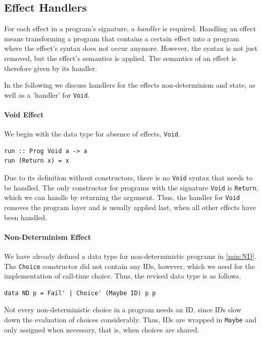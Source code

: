 \documentclass[a4paper, 11pt, fleqn, twoside, abstract=on]{scrreprt}
\newcommand{\hinl}[1]{\texttt{#1}}
\begin{document}
\subsection{Effect Handlers}
\label{subsec:effectHandlers}
For each effect in a program's signature, a \textit{handler} is required.
Handling an effect means transforming a program that contains a certain effect into a program where the effect's syntax does not occur anymore.
However, the syntax is not just removed, but the effect's semantics is applied.
The semantics of an effect is therefore given by its handler.

In the following we discuss handlers for the effects non-determinism and state, as well as a 'handler' for \hinl{Void}.

\paragraph{Void Effect}
We begin with the data type for absence of effects, \hinl{Void}.

\begin{verbatim}
run :: Prog Void a -> a
run (Return x) = x
\end{verbatim}
\noindent
Due to its definition without constructors, there is no \hinl{Void} syntax that needs to be handled.
The only constructor for programs with the signature \hinl{Void} is \hinl{Return}, which we can handle by returning the argument.
Thus, the handler for \hinl{Void} removes the program layer and is usually applied last, when all other effects have been handled.

\paragraph{Non-Determinism Effect}
We have already defined a data type for non-deterministic programs in \autoref{min:ND}.
The \hinl{Choice} constructor did not contain any IDs, however, which we need for the implementation of call-time choice.
Thus, the revised data type is as follows.

\begin{verbatim}
data ND p = Fail' | Choice' (Maybe ID) p p
\end{verbatim}

Not every non-deterministic choice in a program needs an ID, since IDs slow down the evaluation of choices considerably.
Thus, IDs are wrapped in \hinl{Maybe} and only assigned when necessary, that is, when choices are shared.
\end{document}
